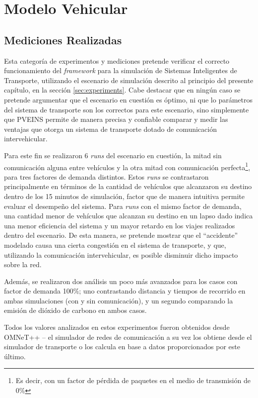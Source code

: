 \section{Modelo Vehicular}\label{sec:results:vehicular}

\subsection{Mediciones Realizadas}

Esta categoría de experimentos y mediciones pretende verificar el correcto funcionamiento del \emph{framework} para la simulación de Sistemas Inteligentes de Transporte, utilizando el escenario de simulación descrito al principio del presente capítulo, en la sección \ref{sec:experiments}. Cabe destacar que en ningún caso se pretende argumentar que el escenario en cuestión es óptimo, ni que lo parámetros del sistema de transporte son los correctos para este escenario, sino simplemente que PVEINS permite de manera precisa y confiable comparar y medir las ventajas que otorga un sistema de transporte dotado de comunicación intervehicular.

Para este fin se realizaron 6 \emph{runs} del escenario en cuestión, la mitad sin comunicación alguna entre vehículos y la otra mitad con comunicación perfecta\footnote{Es decir, con un factor de pérdida de paquetes en el medio de transmisión de 0\%}, para tres factores de demanda distintos. Estos \emph{runs} se contrastaron principalmente en términos de la cantidad de vehículos que alcanzaron su destino dentro de los 15 minutos de simulación, factor que de manera intuitiva permite evaluar el desempeño del sistema. Para \emph{runs} con el mismo factor de demanda, una cantidad menor de vehículos que alcanzan su destino en un lapso dado indica una menor eficiencia del sistema y un mayor retardo en los viajes realizados dentro del escenario. De esta manera, se pretende mostrar que el ``accidente'' modelado causa una cierta congestión en el sistema de transporte, y que, utilizando la comunicación intervehicular, es posible disminuir dicho impacto sobre la red. 

Además, se realizaron dos análisis un poco más avanzados para los casos con factor de demanda 100\%; uno contrastando distancia y tiempos de recorrido en ambas simulaciones (con y sin comunicación), y un segundo comparando la emisión de dióxido de carbono en ambos casos. 

Todos los valores analizados en estos experimentos fueron obtenidos desde OMNeT++ -- el simulador de redes de comunicación a su vez los obtiene desde el simulador de transporte o los calcula en base a datos proporcionados por este último. 

